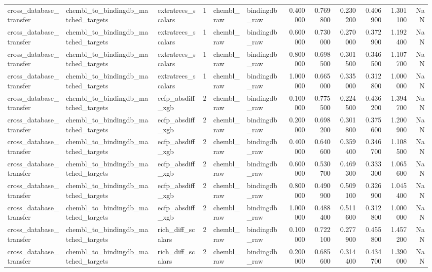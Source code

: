 \begin{longtable}{lllrllrrrrrr}
cross\_database\_transfer & chembl\_to\_bindingdb\_matched\_targets & extratrees\_scalars & 1 & chembl\_raw & bindingdb\_raw & 0.400000 & 0.769800 & 0.230200 & 0.406900 & 1.301100 & NaN \\
cross\_database\_transfer & chembl\_to\_bindingdb\_matched\_targets & extratrees\_scalars & 1 & chembl\_raw & bindingdb\_raw & 0.600000 & 0.730000 & 0.270000 & 0.372900 & 1.192400 & NaN \\
cross\_database\_transfer & chembl\_to\_bindingdb\_matched\_targets & extratrees\_scalars & 1 & chembl\_raw & bindingdb\_raw & 0.800000 & 0.698500 & 0.301500 & 0.346500 & 1.107700 & NaN \\
cross\_database\_transfer & chembl\_to\_bindingdb\_matched\_targets & extratrees\_scalars & 1 & chembl\_raw & bindingdb\_raw & 1.000000 & 0.665000 & 0.335000 & 0.312800 & 1.000000 & NaN \\
cross\_database\_transfer & chembl\_to\_bindingdb\_matched\_targets & ecfp\_absdiff\_xgb & 2 & chembl\_raw & bindingdb\_raw & 0.100000 & 0.775500 & 0.224500 & 0.436200 & 1.394700 & NaN \\
cross\_database\_transfer & chembl\_to\_bindingdb\_matched\_targets & ecfp\_absdiff\_xgb & 2 & chembl\_raw & bindingdb\_raw & 0.200000 & 0.698200 & 0.301800 & 0.375600 & 1.200900 & NaN \\
cross\_database\_transfer & chembl\_to\_bindingdb\_matched\_targets & ecfp\_absdiff\_xgb & 2 & chembl\_raw & bindingdb\_raw & 0.400000 & 0.640600 & 0.359400 & 0.346700 & 1.108500 & NaN \\
cross\_database\_transfer & chembl\_to\_bindingdb\_matched\_targets & ecfp\_absdiff\_xgb & 2 & chembl\_raw & bindingdb\_raw & 0.600000 & 0.530700 & 0.469300 & 0.333300 & 1.065600 & NaN \\
cross\_database\_transfer & chembl\_to\_bindingdb\_matched\_targets & ecfp\_absdiff\_xgb & 2 & chembl\_raw & bindingdb\_raw & 0.800000 & 0.490900 & 0.509100 & 0.326900 & 1.045400 & NaN \\
cross\_database\_transfer & chembl\_to\_bindingdb\_matched\_targets & ecfp\_absdiff\_xgb & 2 & chembl\_raw & bindingdb\_raw & 1.000000 & 0.488400 & 0.511600 & 0.312800 & 1.000000 & NaN \\
cross\_database\_transfer & chembl\_to\_bindingdb\_matched\_targets & rich\_diff\_scalars & 2 & chembl\_raw & bindingdb\_raw & 0.100000 & 0.722100 & 0.277900 & 0.455800 & 1.457200 & NaN \\
cross\_database\_transfer & chembl\_to\_bindingdb\_matched\_targets & rich\_diff\_scalars & 2 & chembl\_raw & bindingdb\_raw & 0.200000 & 0.685600 & 0.314400 & 0.434700 & 1.390000 & NaN \\

\end{longtable}
